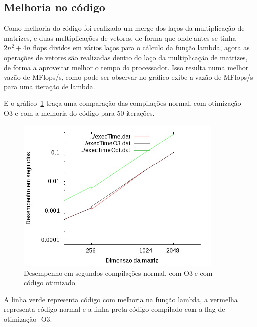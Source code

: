 \documentclass[12pt]{article}
\begin{document}
\clearpage

\subsection{Melhoria no código}\label{sec:melhoria}

Como melhoria do código foi realizado um merge dos laços da multiplicação de
matrizes, e duas multiplicações de vetores, de forma que onde antes se tinha
$2n^2 + 4n$ flops dividos em vários laços para o cálculo da função lambda, agora
as operações de vetores são realizadas dentro do laço da multiplicação de
matrizes, de forma a aproveitar melhor o tempo do processador. Isso resulta numa
melhor vazão de MFlops/s, como pode ser observar no gráfico%
exibe a vazão de MFlops/s para uma iteração de lambda.


E o gráfico~\ref{fig:compExec} traça uma comparação das compilações normal, com
otimização -O3 e com a melhoria do código para 50 iterações.

\begin{figure}[htb] \begin{center}
\includegraphics[width=100mm]{img/compExec.jpg} \end{center}
\caption{Desempenho em segundos compilações normal, com O3 e com código
otimizado}\label{fig:compExec}
\end{figure}

A linha verde representa código com melhoria na função lambda, a vermelha
representa código normal e a linha preta código compilado com a flag de
otimização -O3.
\end{document}
